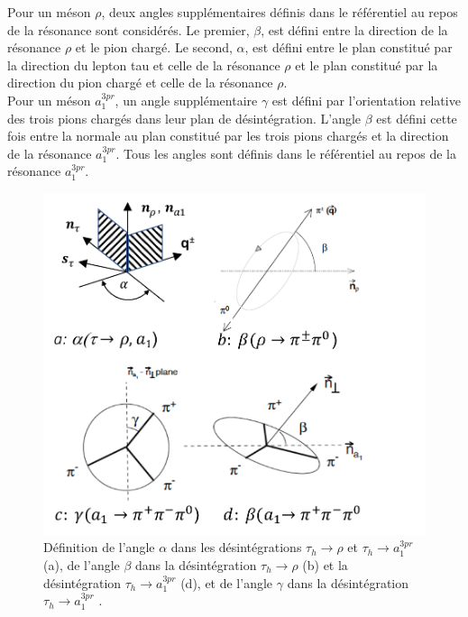 Pour un méson $\rho$, deux angles supplémentaires définis dans le référentiel au repos de la résonance sont considérés. Le premier, $\beta$, est défini entre la direction de la résonance $\rho$ et le pion chargé. Le second, $\alpha$, est défini entre le plan constitué par la direction du lepton tau et celle de la résonance $\rho$ et le plan constitué par la direction du pion chargé et celle de la résonance $\rho$. \\

Pour un méson $a_1^{3pr}$, un angle supplémentaire $\gamma$ est défini par l'orientation relative des trois pions chargés dans leur plan de désintégration. L'angle $\beta$ est défini cette fois entre la normale au plan constitué par les trois pions chargés et la direction de la résonance $a_1^{3pr}$. Tous les angles sont définis dans le référentiel au repos de la résonance $a_1^{3pr}$. \\

\begin{figure}[!ht]
    \centering
    \includegraphics[scale=0.7]{Chapitre6/Images/angles.pdf}
    \caption{Définition de l'angle $\alpha$ dans les désintégrations $\tau_h\to\rho$ et $\tau_h\to a_1^{3pr}$ (a), de l'angle $\beta$ dans la désintégration $\tau_h\to\rho$ (b) et la désintégration $\tau_h\to a_1^{3pr}$ (d), et de l'angle $\gamma$ dans la désintégration $\tau_h\to a_1^{3pr}$ \cite{Zpol}.}
    \label{angles}
\end{figure}

